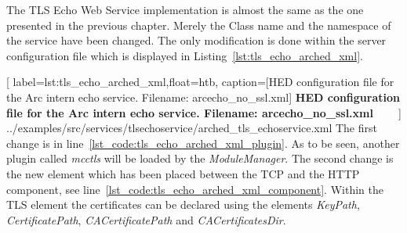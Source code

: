 The TLS Echo Web Service implementation is almost the same as the one presented in the previous chapter. Merely the Class name and the namespace of the service have been changed. The only modification is done within the server configuration file which is displayed in Listing~\ref{lst:tls_echo_arched_xml}.

	[
	label=lst:tls_echo_arched_xml,float=htb,
	caption={[HED configuration file for the Arc intern echo service. Filename: arcecho\_no\_ssl.xml]
	\textbf{HED configuration file for the Arc intern echo service. Filename: arcecho\_no\_ssl.xml\textcolor{white}{hmf}}}
	]
{../examples/src/services/tlsechoservice/arched_tls_echoservice.xml}
The first change is in line~\ref{lst_code:tls_echo_arched_xml_plugin}. As to be seen, another plugin called \textit{mcctls} will be loaded by the \textit{ModuleManager}. The second change is the new element which has been placed between the TCP and the HTTP component, see line~\ref{lst_code:tls_echo_arched_xml_component}. Within the TLS element the certificates can be declared using the elements \textit{KeyPath}, \textit{CertificatePath}, \textit{CACertificatePath} and \textit{CACertificatesDir}.
% 
% 
% 


%
%
%
%
% 


